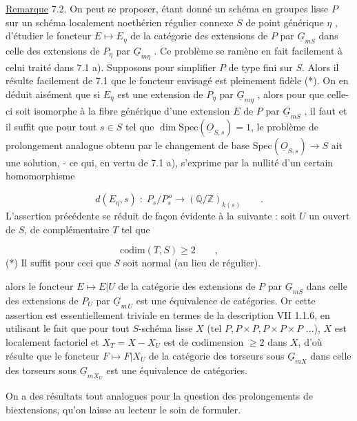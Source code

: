 \underline{Remarque} 7.2. On peut se proposer, étant donné un schéma en groupes lisse $P$ sur un schéma localement noethérien régulier connexe $S$ de point générique $\eta$ , d'étudier le foncteur $E \longmapsto E_\eta$ de la catégorie des extensions de $P$ par $\underline{G}_{mS}$ dans celle des extensions de $P_\eta$ par $\underline{G}_{m\eta}$ . Ce problème se ramène en fait facilement à celui traité dans 7.1 a). Supposons pour simplifier $P$ de type fini sur $S$. Alors il résulte facilement de 7.1 que le foncteur envisagé est pleinement fidèle (*). On en déduit aisément que si $E_\eta$ est une extension de $P_\eta$ par $\underline{G}_{m\eta}$ , alors pour que celle-ci soit isomorphe à la fibre générique d'une extension $E$ de $P$ par $\underline{G}_{mS}$ , il faut et il suffit que pour tout $s \in S$ tel que $\dim \mathrm{Spec}(\underline{O}_{S,s}) = 1$, le problème de prolongement analogue obtenu par le changement de base $\mathrm{Spec}(\underline{O}_{S,s}) \to S$ ait une solution, - ce qui, en vertu de 7.1 a), s'exprime par la nullité d'un certain homomorphisme

\begin{equation}\tag{7.2.1}
d(E_\eta ,s) \; : \; P_s/P_s^{\,o} \longrightarrow (\mathbb{Q}/\mathbb{Z})_{k(s)} \qquad .
\end{equation}
L'assertion précédente se réduit de façon évidente à la suivante : soit $U$ un ouvert de $S$, de complémentaire $T$ tel que

\begin{equation*}
\mathrm{codim}(T,S) \geqslant 2 \qquad , \qquad 
\end{equation*}
(*) Il suffit pour ceci que $S$ soit normal (au lieu de régulier).



 alors le foncteur $E \longmapsto E|U$ de la catégorie des extensions de $P$ par $\underline{G}_{mS}$ dans celle des extensions de $P_U$ par $\underline{G}_{m\,U}$ est une équivalence de catégories. Or cette assertion est essentiellement triviale en termes de la description VII 1.1.6, en utilisant le fait que pour tout $S$-schéma lisse $X$ (tel $P, P\times P, P\times P\times P$ ...), $X$ est localement factoriel et $X_T = X - X_U$ est de codimension $\geqslant 2$ dans $X$, d'où résulte que le foncteur $F \longmapsto F|X_U$ de la catégorie des torseurs sous $\underline{G}_{mX}$ dans celle des torseurs sous $\underline{G}_{mX_U}$ est une équivalence de catégories.

On a des résultats tout analogues pour la question des prolongements de biextensions, qu'on laisse au lecteur le soin de formuler.

